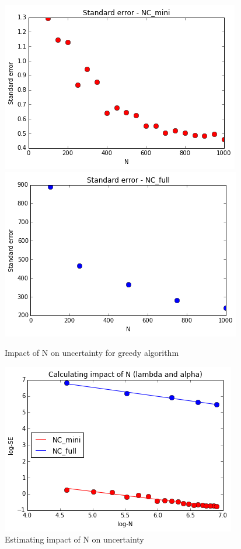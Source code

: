 \documentclass[11pt]{scrartcl} %
\begin{document}
\begin{figure}
\centering
\includegraphics[width=10 cm]{StandardErrorVsN}
\includegraphics[width=10 cm]{StandardErrorVsNFull}

\caption{Impact of N on uncertainty for greedy algorithm}
\label{fig:StandardError}
\end{figure}

\begin{figure}
\centering
\includegraphics[width=10 cm]{LinearR}
\caption{Estimating impact of N on uncertainty}
\label{fig:LR}
\end{figure}
\end{document}
